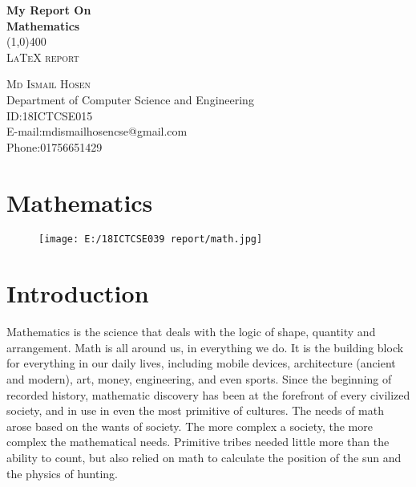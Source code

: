 \documentclass{article}
\begin{document}
\begin{titlepage}
\begin{center}
\huge{\bfseries My Report On}\\
\huge{\bfseries Mathematics}\\
\line(1,0){400}\\
\textsc{\LARGE LaTeX report}\\
\end{center}

\begin{flushright}
\textsc{\LARGE Md Ismail Hosen\\}
Department of Computer Science and Engineering\\
ID:18ICTCSE015\\
E-mail:mdismailhosencse@gmail.com\\
Phone:01756651429\\
\end{flushright}

\end{titlepage}

\tableofcontents
\thispagestyle{empty}
\cleardoublepage


\setcounter{page}{1}
\section{Mathematics}
\begin{figure}[H]
\texttt{[image: E:/18ICTCSE039 report/math.jpg]}
\end{figure}

\section{Introduction}
Mathematics is the science that deals with the logic of shape, quantity and arrangement. Math is all around us, in everything we do. It is the building block for everything in our daily lives, including mobile devices, architecture (ancient and modern), art, money, engineering, and even sports.\newline \newline
Since the beginning of recorded history, mathematic discovery has been at the forefront of every civilized society, and in use in even the most primitive of cultures. The needs of math arose based on the wants of society. The more complex a society, the more complex the mathematical needs. Primitive tribes needed little more than the ability to count, but also relied on math to calculate the position of the sun and the physics of hunting.
\end{document}
